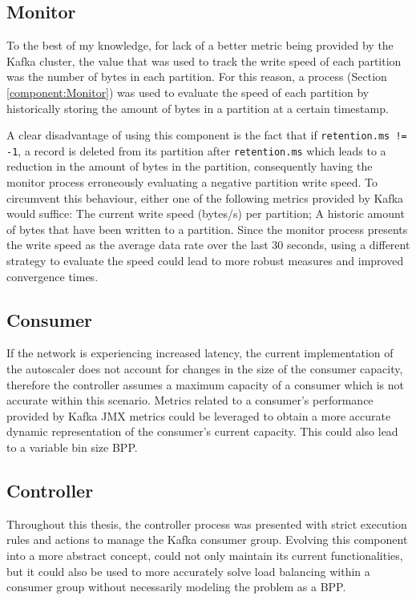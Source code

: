 \subsection{Monitor}

To the best of my knowledge, for lack of a better metric being provided by the
Kafka cluster, the value that was used to track the write speed of each
partition was the number of bytes in each partition. For this reason, a process
(Section \ref{component:Monitor}) was used to evaluate the speed of each partition by
historically storing the amount of bytes in a partition at a certain timestamp.

A clear disadvantage of using this component is the fact that if
\lstinline{retention.ms != -1}, a record is deleted from its partition after
\lstinline{retention.ms} which leads to a reduction in the amount of bytes in
the partition, consequently having the monitor process erroneously evaluating a
negative partition write speed. To circumvent this behaviour, either one of the
following metrics provided by Kafka would suffice: The current write speed
(bytes/s) per partition; A historic amount of bytes that have been written to a
partition. Since the monitor process presents the write speed as the average
data rate over the last 30 seconds, using a different strategy to evaluate the
speed could lead to more robust measures and improved convergence times.

\subsection{Consumer}

If the network is experiencing increased latency, the current implementation of
the autoscaler does not account for changes in the size of the consumer
capacity, therefore the controller assumes a maximum capacity of a consumer
which is not accurate within this scenario. Metrics related to a consumer's
performance provided by Kafka JMX metrics could be leveraged to obtain a more
accurate dynamic representation of the consumer's current capacity. This could
also lead to a variable bin size BPP.

\subsection{Controller}

Throughout this thesis, the controller process was presented with strict
execution rules and actions to manage the Kafka consumer group. Evolving this
component into a more abstract concept, could not only maintain its current
functionalities, but it could also be used to more accurately solve load
balancing within a consumer group without necessarily modeling the problem as a
BPP. 

